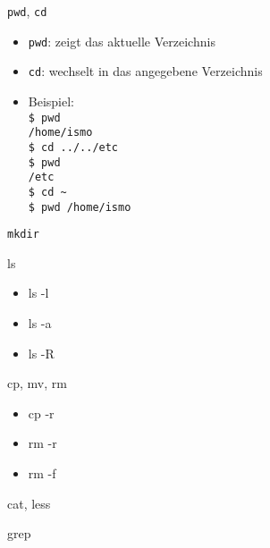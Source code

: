 \documentclass[t]{beamer}
\begin{document}
      \begin{frame}{\texttt{pwd}, \texttt{cd}}
        \begin{itemize}
          \item \texttt{pwd}: zeigt das aktuelle Verzeichnis
          \item \texttt{cd}: wechselt in das angegebene Verzeichnis
          \item Beispiel:\\
            \texttt{\$ pwd\\
                    /home/ismo\\
                    \$ cd ../../etc\\
                    \$ pwd\\
                    /etc\\
                    \$ cd \textasciitilde\\
                    \$ pwd
                    /home/ismo}
        \end{itemize}
      \end{frame}

      \begin{frame}{\texttt{mkdir}}
      \end{frame}

      \begin{frame}{ls}
        \begin{itemize}
          \item ls -l\\
          \item ls -a\\
          \item ls -R
        \end{itemize}
      \end{frame}

      \begin{frame}{cp, mv, rm}
        \begin{itemize}
          \item cp -r\\
          \item rm -r\\
          \item rm -f
        \end{itemize}
      \end{frame}

      \begin{frame}{cat, less}
      \end{frame}

      \begin{frame}{grep}
      \end{frame}
\end{document}
